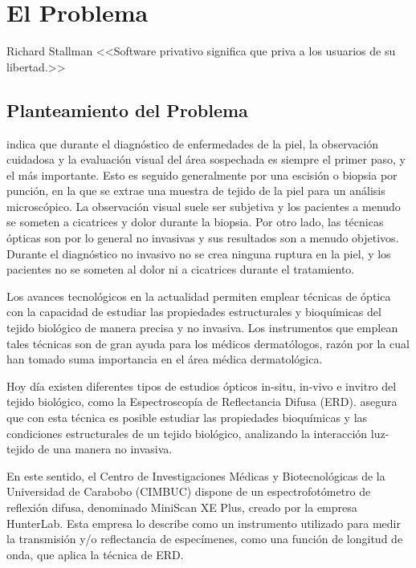 \chapter{\label{cap:1}El Problema}

\begin{chapquote}{Richard Stallman}
<<Software privativo significa que priva a los usuarios de su libertad.>>
\end{chapquote}

	\section{Planteamiento del Problema}	
\cite{Bersha} indica que durante el diagn\'{o}stico de enfermedades de la piel, la observaci\'{o}n cuidadosa y la evaluaci\'{o}n visual del \'{a}rea sospechada es siempre el primer paso, y el m\'{a}s importante. Esto es seguido generalmente por una escisi\'{o}n o biopsia por punci\'{o}n, en la que se extrae una muestra de tejido de la piel para un an\'{a}lisis microsc\'{o}pico. La observaci\'{o}n visual suele ser subjetiva y los pacientes a menudo se someten a cicatrices y dolor durante la biopsia. Por otro lado, las t\'{e}cnicas \'{o}pticas son por lo general no invasivas y sus resultados son a menudo objetivos. Durante el diagn\'{o}stico no invasivo no se crea ninguna ruptura en la piel, y los pacientes no se someten al dolor ni a cicatrices durante el tratamiento.

Los avances tecnol\'{o}gicos en la actualidad permiten emplear t\'{e}cnicas de \'{o}ptica con la capacidad de estudiar  las propiedades estructurales y bioqu\'{i}micas del tejido biol\'{o}gico de manera precisa y no invasiva. Los instrumentos que emplean tales t\'{e}cnicas son de gran ayuda para los m\'{e}dicos dermat\'{o}logos, raz\'{o}n por la cual han tomado suma importancia en el \'{a}rea m\'{e}dica dermatol\'{o}gica.

Hoy d\'{i}a existen diferentes tipos de estudios \'{o}pticos in-situ, in-vivo e invitro del tejido biol\'{o}gico, como la Espectroscop\'{i}a de Reflectancia Difusa (ERD). \cite{Perez-Gallardo} asegura que con esta t\'{e}cnica es  posible estudiar las propiedades bioqu\'{i}micas y las condiciones estructurales de un tejido biol\'{o}gico, analizando la interacci\'{o}n luz-tejido de una manera no invasiva.

En este sentido, el Centro de Investigaciones M\'{e}dicas y Biotecnol\'{o}gicas de la Universidad de Carabobo (CIMBUC) dispone de un espectrofot\'{o}metro de reflexi\'{o}n difusa, denominado MiniScan XE Plus, creado por la empresa HunterLab. Esta empresa lo describe como un instrumento utilizado para medir la transmisi\'{o}n y/o reflectancia de espec\'{i}menes, como una funci\'{o}n de longitud de onda, que aplica la t\'{e}cnica de ERD. 


